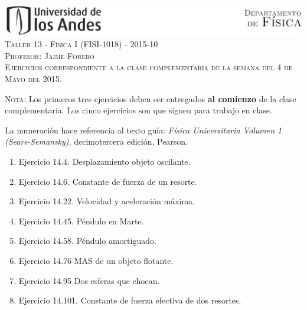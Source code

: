 \documentclass[letterpaper,10pt,onecolumn]{article}
\begin{document}
\begin{center}

\includegraphics[width=490pt]{figs/header.png}\\[0.5cm]

\textsc{\LARGE Taller 13 - F\'isica I (FISI-1018) - 2015-10}\\[0.5cm]

\textsc{\Large{Profesor: Jaime Forero}} \\[0.5cm]

\noindent\textsc{Ejercicios correspondiente a la clase complementaria
  de la semana del 4 de Mayo del 2015.}\\[0.5cm]
\end{center}

\noindent\textsc{Nota:} Los primeros tres ejercicios deben ser
entregados {\bf al comienzo} de la clase complementaria.  Los cinco ejercicios son que siguen para trabajo en clase.

La numeraci\'on hace referencia al texto
gu\'ia: \textit{F\'isica Universitaria Volumen  1 (Sears-Semansky)},
decimotercera edici\'on, Pearson. 

\begin{enumerate}
\item Ejercicio 14.4. Desplazamiento objeto oscilante.
\item Ejercicio 14.6. Constante de fuerza de un resorte.
\item Ejercicio 14.22. Velocidad y aceleraci\'on m\'axima.
\item Ejercicio 14.45. P\'endulo en Marte.
\item Ejercicio 14.58. P\'endulo amortiguado.
\item Ejercicio 14.76 MAS de un objeto flotante.
\item Ejercicio 14.95 Dos esferas que chocan.
\item Ejercicio 14.101. Constante de fuerza efectiva de dos resortes.
\end{enumerate}
\end{document}
